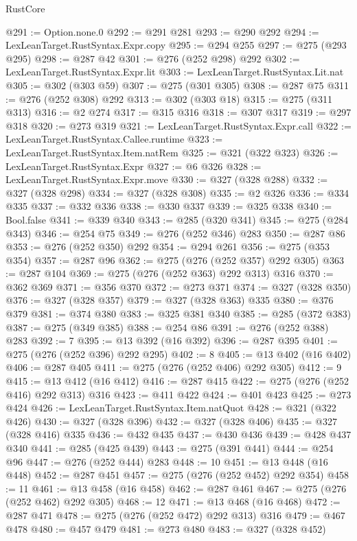 \begin{lexlean}{RustCore}
\begin{coremodule}
@291 := Option.none.{0}
@292 := @291 @281
@293 := @290 @292
@294 := LexLeanTarget.RustSyntax.Expr.copy
@295 := @294 @255
@297 := @275 (@293 @295)
@298 := @287 @42
@301 := @276 (@252 @298) @292
@302 := LexLeanTarget.RustSyntax.Expr.lit
@303 := LexLeanTarget.RustSyntax.Lit.nat
@305 := @302 (@303 @59)
@307 := @275 (@301 @305)
@308 := @287 @75
@311 := @276 (@252 @308) @292
@313 := @302 (@303 @18)
@315 := @275 (@311 @313)
@316 := @2 @274
@317 := @315 @316
@318 := @307 @317
@319 := @297 @318
@320 := @273 @319
@321 := LexLeanTarget.RustSyntax.Expr.call
@322 := LexLeanTarget.RustSyntax.Callee.runtime
@323 := LexLeanTarget.RustSyntax.Item.natRem
@325 := @321 (@322 @323)
@326 := LexLeanTarget.RustSyntax.Expr
@327 := @6 @326
@328 := LexLeanTarget.RustSyntax.Expr.move
@330 := @327 (@328 @288)
@332 := @327 (@328 @298)
@334 := @327 (@328 @308)
@335 := @2 @326
@336 := @334 @335
@337 := @332 @336
@338 := @330 @337
@339 := @325 @338
@340 := Bool.false
@341 := @339 @340
@343 := @285 (@320 @341)
@345 := @275 (@284 @343)
@346 := @254 @75
@349 := @276 (@252 @346) @283
@350 := @287 @86
@353 := @276 (@252 @350) @292
@354 := @294 @261
@356 := @275 (@353 @354)
@357 := @287 @96
@362 := @275 (@276 (@252 @357) @292 @305)
@363 := @287 @104
@369 := @275 (@276 (@252 @363) @292 @313) @316
@370 := @362 @369
@371 := @356 @370
@372 := @273 @371
@374 := @327 (@328 @350)
@376 := @327 (@328 @357)
@379 := @327 (@328 @363) @335
@380 := @376 @379
@381 := @374 @380
@383 := @325 @381 @340
@385 := @285 (@372 @383)
@387 := @275 (@349 @385)
@388 := @254 @86
@391 := @276 (@252 @388) @283
@392 := 7
@395 := @13 @392 (@16 @392)
@396 := @287 @395
@401 := @275 (@276 (@252 @396) @292 @295)
@402 := 8
@405 := @13 @402 (@16 @402)
@406 := @287 @405
@411 := @275 (@276 (@252 @406) @292 @305)
@412 := 9
@415 := @13 @412 (@16 @412)
@416 := @287 @415
@422 := @275 (@276 (@252 @416) @292 @313) @316
@423 := @411 @422
@424 := @401 @423
@425 := @273 @424
@426 := LexLeanTarget.RustSyntax.Item.natQuot
@428 := @321 (@322 @426)
@430 := @327 (@328 @396)
@432 := @327 (@328 @406)
@435 := @327 (@328 @416) @335
@436 := @432 @435
@437 := @430 @436
@439 := @428 @437 @340
@441 := @285 (@425 @439)
@443 := @275 (@391 @441)
@444 := @254 @96
@447 := @276 (@252 @444) @283
@448 := 10
@451 := @13 @448 (@16 @448)
@452 := @287 @451
@457 := @275 (@276 (@252 @452) @292 @354)
@458 := 11
@461 := @13 @458 (@16 @458)
@462 := @287 @461
@467 := @275 (@276 (@252 @462) @292 @305)
@468 := 12
@471 := @13 @468 (@16 @468)
@472 := @287 @471
@478 := @275 (@276 (@252 @472) @292 @313) @316
@479 := @467 @478
@480 := @457 @479
@481 := @273 @480
@483 := @327 (@328 @452)

\end{coremodule}
\end{lexlean}
